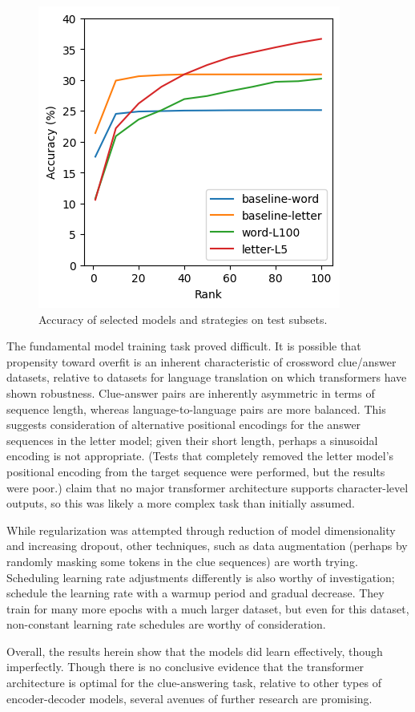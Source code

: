 \documentclass[letterpaper]{article} %
\begin{document}
\begin{NoHyper}
\begin{figure}
\centering
\includegraphics[width=0.75\columnwidth]{fig-test-acc}
\caption{Accuracy of selected models and strategies on test subsets.}
\label{fig:test-acc}
\end{figure}

The fundamental model training task proved difficult.
It is possible that propensity toward overfit is an inherent characteristic of crossword clue/answer datasets, relative
to datasets for language translation on which transformers have shown robustness.
Clue-answer pairs are inherently asymmetric in terms of sequence length, whereas language-to-language pairs are more balanced.
This suggests consideration of alternative positional encodings for the answer sequences in the letter model;
given their short length, perhaps a sinusoidal encoding is not appropriate.
(Tests that completely removed the letter model's positional encoding from the target sequence were performed, but the results were poor.)
\citeauthor{kulshreshtha2022across} claim that no major transformer architecture supports character-level outputs, so
this was likely a more complex task than initially assumed.

While regularization was attempted through reduction of model dimensionality and increasing dropout, other
techniques, such as data augmentation (perhaps by randomly masking some tokens in the clue sequences) are worth trying.
Scheduling learning rate adjustments differently is also worthy of investigation; \citeauthor{vaswani2017} schedule the
learning rate with a warmup period and gradual decrease.
They train for many more epochs with a much larger dataset, but even for this dataset, non-constant learning rate
schedules are worthy of consideration.

Overall, the results herein show that the models did learn effectively, though imperfectly.
Though there is no conclusive evidence that the transformer architecture is optimal for the clue-answering task,
relative to other types of encoder-decoder models, several avenues of further research are promising.



\end{NoHyper}
\end{document}
